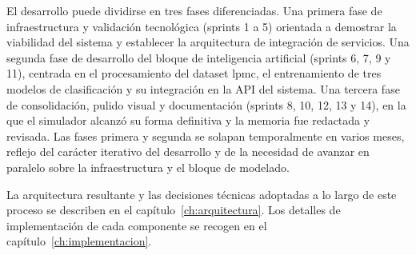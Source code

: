 El desarrollo puede dividirse en tres fases diferenciadas. Una primera fase de infraestructura y validación tecnológica (sprints 1 a 5) orientada a demostrar la viabilidad del sistema y establecer la arquitectura de integración de servicios. Una segunda fase de desarrollo del bloque de inteligencia artificial (sprints 6, 7, 9 y 11), centrada en el procesamiento del dataset \gls{lpmc}, el entrenamiento de tres modelos de clasificación y su integración en la API del sistema. Una tercera fase de consolidación, pulido visual y documentación (sprints 8, 10, 12, 13 y 14), en la que el simulador alcanzó su forma definitiva y la memoria fue redactada y revisada. Las fases primera y segunda se solapan temporalmente en varios meses, reflejo del carácter iterativo del desarrollo y de la necesidad de avanzar en paralelo sobre la infraestructura y el bloque de modelado.\newline

La arquitectura resultante y las decisiones técnicas adoptadas a lo largo de este proceso se describen en el capítulo~\ref{ch:arquitectura}. Los detalles de implementación de cada componente se recogen en el capítulo~\ref{ch:implementacion}.
